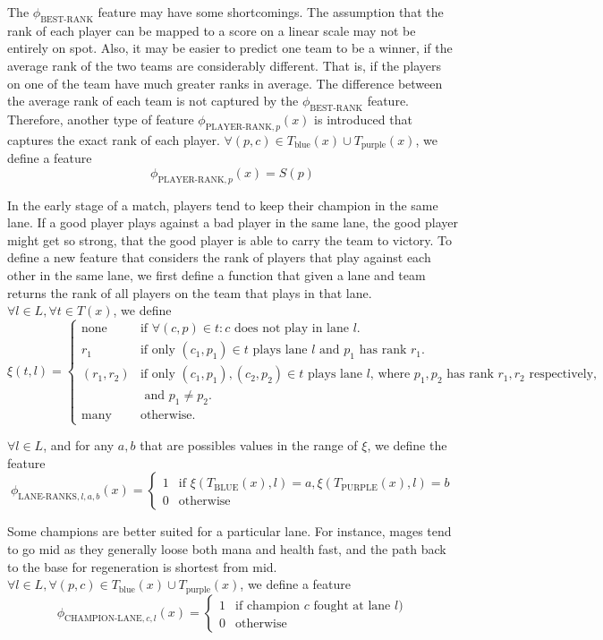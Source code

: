 The $\phi_\text{BEST-RANK}$ feature may have some shortcomings. The assumption that the rank of each player can be mapped to a score on a linear scale may not be entirely on spot.
Also, it may be easier to predict one team to be a winner, if the average rank of the two teams are considerably different. That is, if the players on one of the team have much greater ranks in average. The difference between the average rank of each team is not captured by the $\phi_\text{BEST-RANK}$ feature.
Therefore, another type of feature $\phi_{\text{PLAYER-RANK},p}(x)$ is introduced that captures the exact rank of each player.
$\forall(p, c) \in T_\text{blue}(x) \cup T_\text{purple}(x)$, we define a feature
\[
\phi_{\text{PLAYER-RANK},p}(x) = S(p)
\]

In the early stage of a match, players tend to keep their champion in the same lane.
If a good player plays against a bad player in the same lane, the good player might get so strong, that the good player is able to carry the team to victory.
To define a new feature that considers the rank of players that play against each other in the same lane,
we first define a function that given a lane and team returns the rank of all players on the team that plays in that lane.
$\forall l \in L, \forall t \in T(x)$, we define
\[
\xi(t,l) =
\begin{cases} 
  \text{none} & \text{if } \forall(c, p) \in t: c \text{ does not play in lane } l. \\
  r_1 & \text{if only } (c_1, p_1) \in t \text{ plays lane } l \text{ and } p_1 \text{ has rank } r_1 \text{.}\\
  (r_1, r_2) & \text{if only } (c_1, p_1), (c_2, p_2) \in t \text{ plays lane } l \text{, where } p_1, p_2 \text{ has rank } r_1, r_2 \text{ respectively,}\\
  & \text{ and } p_1 \neq p_2.\\
  \text{many} & \text{otherwise}.
\end{cases}
\]

$\forall l \in L$, and for any $a,b$ that are possibles values in the range of $\xi$, we define the feature
\[
\phi_{\text{LANE-RANKS},l,a,b}(x) =
\begin{cases} 
  1 & \text{if } \xi(T_\text{BLUE}(x),l) = a, \xi(T_\text{PURPLE}(x),l) = b\\
  0 & \text{otherwise} 
\end{cases}
\]

Some champions are better suited for a particular lane. For instance, mages tend to go mid as they generally loose both mana and health fast, and the path back to the base for regeneration is shortest from mid.
$\forall l \in L, \forall(p, c) \in T_\text{blue}(x) \cup T_\text{purple}(x)$, we define a feature
\[
\phi_{\text{CHAMPION-LANE},c,l}(x) =
\begin{cases} 
  1 & \text{if champion } c \text{ fought at lane } l)\\
  0 & \text{otherwise} 
\end{cases}
\]

